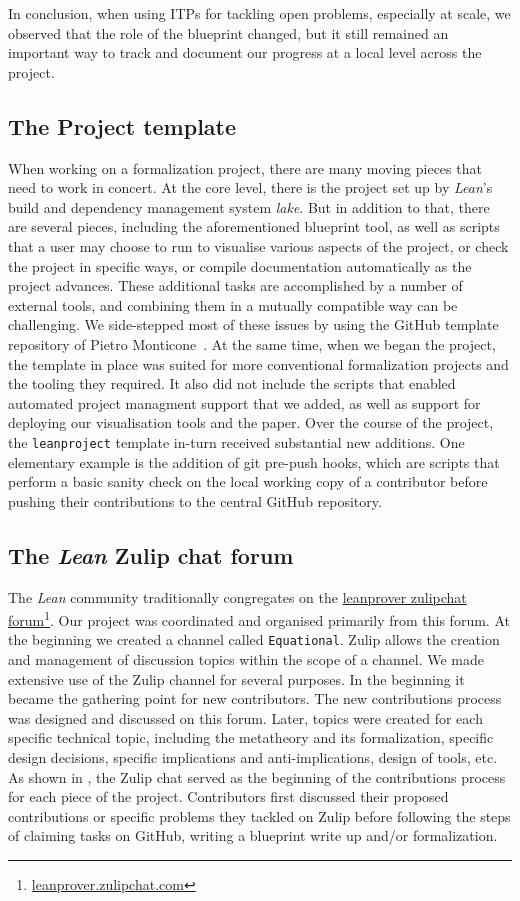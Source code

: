 In conclusion, when using ITPs for tackling open problems, especially at scale, we observed that the role of the blueprint changed, but it still remained an important way to track and document our progress at a local level across the project.

\subsection{The Project template}
When working on a formalization project, there are many moving pieces that need to work in concert. At the core level, there is the project set up by \emph{Lean}'s build and dependency management system \emph{lake}. But in addition to that, there are several pieces, including the aforementioned blueprint tool, as well as scripts that a user may choose to run to visualise various aspects of the project, or check the project in specific ways, or compile documentation automatically as the project advances. These additional tasks are accomplished by a number of external tools, and combining them in a mutually compatible way can be challenging. We side-stepped most of these issues by using the GitHub template repository of Pietro Monticone~\cite{Monticone_LeanProject_2025}. At the same time, when we began the project, the template in place was suited for more conventional formalization projects and the tooling they required. It also did not include the scripts that enabled automated project managment support that we added, as well as support for deploying our visualisation tools and the paper. Over the course of the project, the \texttt{leanproject} template in-turn received substantial new additions. One elementary example is the addition of git pre-push hooks, which are scripts that perform a basic sanity check on the local working copy of a contributor before pushing their contributions to the central GitHub repository.

\subsection{The  \emph{Lean} Zulip chat forum}
The \emph{Lean} community traditionally congregates on the \href{leanprover.zulipchat.com}{leanprover zulipchat forum}\footnote{\url{leanprover.zulipchat.com}}. Our project was coordinated and organised primarily from this forum. At the beginning we created a channel called \texttt{Equational}. Zulip allows the creation and management of discussion topics within the scope of a channel. We made extensive use of the Zulip channel for several purposes. In the beginning it became the gathering point for new contributors. The new contributions process was designed and discussed on this forum. Later, topics were created for each specific technical topic, including the metatheory and its formalization, specific design decisions, specific implications and anti-implications, design of tools, etc. As shown in , the Zulip chat served as the beginning of the contributions process for each piece of the project. Contributors first discussed their proposed contributions or specific problems they tackled on Zulip before following the steps of claiming tasks on GitHub, writing a blueprint write up and/or formalization.


